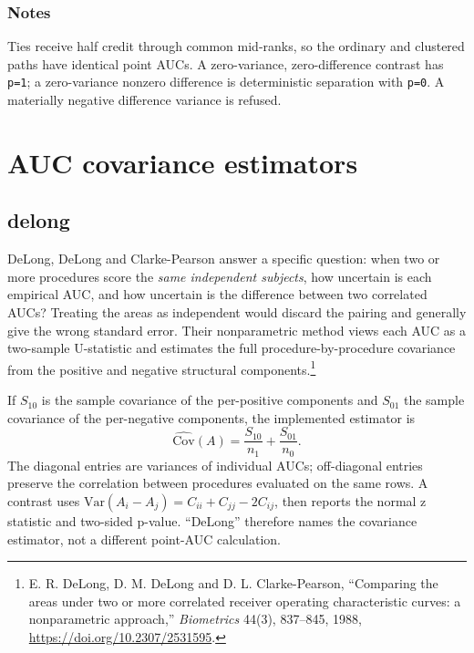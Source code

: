 \subsubsection{Notes}
Ties receive half credit through common mid-ranks, so the ordinary and clustered
paths have identical point AUCs.  A zero-variance, zero-difference contrast has
\texttt{p=1}; a zero-variance nonzero difference is deterministic separation
with \texttt{p=0}.  A materially negative difference variance is refused.

\section{AUC covariance estimators}\label{auc_estimators}

\subsection{delong}
DeLong, DeLong and Clarke-Pearson answer a specific question: when two or more
procedures score the \emph{same independent subjects}, how uncertain is each
empirical AUC, and how uncertain is the difference between two correlated AUCs?
Treating the areas as independent would discard the pairing and generally give
the wrong standard error.  Their nonparametric method views each AUC as a
two-sample U-statistic and estimates the full procedure-by-procedure covariance
from the positive and negative structural components.\footnote{E. R. DeLong,
D. M. DeLong and D. L. Clarke-Pearson, ``Comparing the areas under two or more
correlated receiver operating characteristic curves: a nonparametric
approach,'' \emph{Biometrics} 44(3), 837--845, 1988,
\url{https://doi.org/10.2307/2531595}.}

If $S_{10}$ is the sample covariance of the per-positive components and
$S_{01}$ the sample covariance of the per-negative components, the implemented
estimator is
\begin{displaymath}
 \widehat{\mathrm{Cov}}(A)=\frac{S_{10}}{n_1}+\frac{S_{01}}{n_0}.
\end{displaymath}
The diagonal entries are variances of individual AUCs; off-diagonal entries
preserve the correlation between procedures evaluated on the same rows.  A
contrast uses
$\mathrm{Var}(A_i-A_j)=C_{ii}+C_{jj}-2C_{ij}$, then reports the normal
z statistic and two-sided p-value.  ``DeLong'' therefore names the covariance
estimator, not a different point-AUC calculation.

